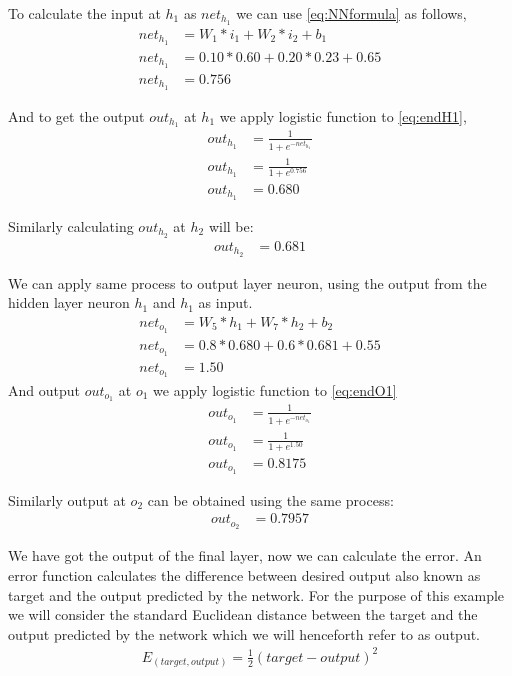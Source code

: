 To calculate the input at $h_{1}$ as $net_{h_{1}}$ we can use \ref{eq:NNformula} as follows,
\begin{align}
    net_{h_{1}} &= W_{1} * i_{1} + W_{2} * i_{2} +b_{1}\\
    net_{h_{1}} &= 0.10 * 0.60 + 0.20 * 0.23 + 0.65 \\
    net_{h_{1}} &= 0.756 \label{eq:endH1}
\end{align}

And to get the output $out_{h_{1}}$ at $h_{1}$ we apply logistic function to \ref{eq:endH1},
\begin{align}
    out_{h_{1}} &= \frac{1}{1+e^{-net_{h_{1}}}}\\
    out_{h_{1}} &=  \frac{1}{1+e^{0.756}}\\
    out_{h_{1}} &= 0.680 \label{eq:outH1}
\end{align}

Similarly calculating $out_{h_{2}}$ at $h_{2}$ will be:
\begin{align}
    out_{h_{2}} &= 0.681
\end{align}

We can apply same process to output layer neuron, using the output from the hidden layer neuron $h_{1}$ and $h_{1}$ as input.
\begin{align}
    net_{o_{1}} &= W_{5} * h_{1} + W_{7} * h_{2} +b_{2} \label{eq:net_out_1}\\
    net_{o_{1}} &= 0.8 *0.680 +0.6 *0.681 +0.55 \\
    net_{o_{1}} &= 1.50 \label{eq:endO1}
\end{align}
And output $out_{o_{1}}$ at $o_{1}$ we apply logistic function to \ref{eq:endO1}
\begin{align}
    out_{o_{1}} &= \frac{1}{1+e^{-net_{o_{1}}}}\\
    out_{o_{1}} &=  \frac{1}{1+e^{1.50}}\\
    out_{o_{1}} &= 0.8175
\end{align}

Similarly output at $o_{2}$ can be obtained using the same process:
\begin{align}
    out_{o_{2}} &= 0.7957
\end{align}

We have got the output of the final layer, now we can calculate the error. An error function calculates the difference between desired output also known as target and the output predicted by the network. For the purpose of this example we will consider the standard Euclidean distance between the target and the output predicted by the network which we will henceforth refer to as output. 
\begin{align}\label{eq:error}
E_{(target, output)} = \frac{1}{2} (target - output)^{2}    
\end{align}


